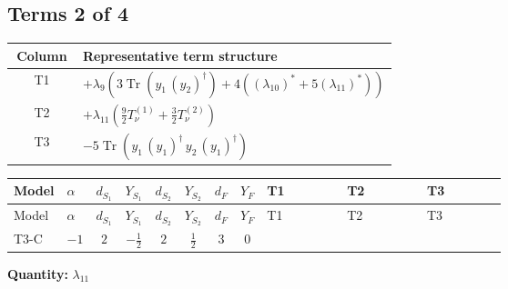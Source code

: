 \documentclass[8pt]{article}
\begin{document}
\begin{landscape}
\subsection*{Terms 2 of 4}
\begin{center}
\begin{tabular}{@{}c >{\raggedright\arraybackslash}p{0.82\linewidth}@{}}
\toprule
Column & Representative term structure \\
\midrule
T1 & \(\displaystyle +{\lambda_{9}} (3 \operatorname{Tr}\!\left({y_1}\,\left({y_2}\right)^{\dagger}\right)+4 (\left({\lambda_{10}}\right)^{*}+5 \left({\lambda_{11}}\right)^{*}))\) \\
\midrule
T2 & \(\displaystyle +{\lambda_{11}} \left(\frac{9}{2} T_{\nu}^{(1)}+\frac{3}{2} T_{\nu}^{(2)}\right)\) \\
\midrule
T3 & \(\displaystyle -5 \operatorname{Tr}\!\left({y_1}\,\left({y_1}\right)^{\dagger}\,{y_2}\,\left({y_1}\right)^{\dagger}\right)\) \\
\midrule
\bottomrule
\end{tabular}
\end{center}
\smallskip
\tiny
\begin{longtable}{@{}llcccccc >{\raggedright\arraybackslash}p{0.21\linewidth} >{\raggedright\arraybackslash}p{0.21\linewidth} >{\raggedright\arraybackslash}p{0.21\linewidth}@{}}
\toprule
Model & $\alpha$ & $d_{S_1}$ & $Y_{S_1}$ & $d_{S_2}$ & $Y_{S_2}$ & $d_F$ & $Y_F$ & T1 & T2 & T3 \\
\midrule
\endfirsthead
\toprule
Model & $\alpha$ & $d_{S_1}$ & $Y_{S_1}$ & $d_{S_2}$ & $Y_{S_2}$ & $d_F$ & $Y_F$ & T1 & T2 & T3 \\
\midrule
\endhead
T3-C & $-1$ & $2$ & $-\frac{1}{2}$ & $2$ & $\frac{1}{2}$ & $3$ & $0$ & \scriptsize\adjustbox{max width=\linewidth}{$\begin{gathered} +{\lambda_{9}} (3 \operatorname{Tr}\!\left({y_1}\,\left({y_2}\right)^{\dagger}\right)+4 (\left({\lambda_{10}}\right)^{*}+5 \left({\lambda_{11}}\right)^{*}))\end{gathered}$} & \scriptsize\adjustbox{max width=\linewidth}{$\begin{gathered} +{\lambda_{11}} \left(\frac{9}{2} T_{\nu}^{(1)}+\frac{3}{2} T_{\nu}^{(2)}\right)\end{gathered}$} & \scriptsize\adjustbox{max width=\linewidth}{$\begin{gathered} -5 \operatorname{Tr}\!\left({y_1}\,\left({y_1}\right)^{\dagger}\,{y_2}\,\left({y_1}\right)^{\dagger}\right)\end{gathered}$} \\
\midrule
\bottomrule
\end{longtable}
\clearpage
\noindent\textbf{Quantity: }$\lambda_{11}$\par\smallskip

\end{landscape}
\end{document}
